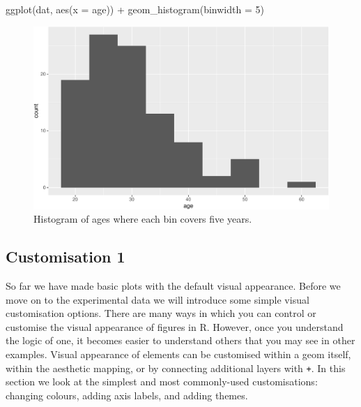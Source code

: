 \documentclass[
  english,
  doc,floatsintext]{apa6}
\newenvironment{Shaded}{\begin{snugshade}}{\end{snugshade}}
\newcommand{\AttributeTok}[1]{\textcolor[rgb]{0.77,0.63,0.00}{#1}}
\newcommand{\DecValTok}[1]{\textcolor[rgb]{0.00,0.00,0.81}{#1}}
\newcommand{\FunctionTok}[1]{\textcolor[rgb]{0.00,0.00,0.00}{#1}}
\newcommand{\NormalTok}[1]{#1}
\newcommand{\SpecialCharTok}[1]{\textcolor[rgb]{0.00,0.00,0.00}{#1}}
\begin{document}
\begin{Shaded}
\begin{Highlighting}[]
\FunctionTok{ggplot}\NormalTok{(dat, }\FunctionTok{aes}\NormalTok{(}\AttributeTok{x =}\NormalTok{ age)) }\SpecialCharTok{+}
  \FunctionTok{geom\_histogram}\NormalTok{(}\AttributeTok{binwidth =} \DecValTok{5}\NormalTok{)}
\end{Highlighting}
\end{Shaded}

\begin{figure}

{\centering \includegraphics[width=1\linewidth]{images/histogram2-1} 

}

\caption{Histogram of ages where each bin covers five years.}\label{fig:histogram2}
\end{figure}

\hypertarget{customisation-1}{%
\subsection{Customisation 1}\label{customisation-1}}

So far we have made basic plots with the default visual appearance. Before we move on to the experimental data we will introduce some simple visual customisation options. There are many ways in which you can control or customise the visual appearance of figures in R. However, once you understand the logic of one, it becomes easier to understand others that you may see in other examples. Visual appearance of elements can be customised within a geom itself, within the aesthetic mapping, or by connecting additional layers with \texttt{+}. In this section we look at the simplest and most commonly-used customisations: changing colours, adding axis labels, and adding themes.
\end{document}
